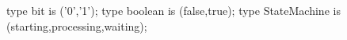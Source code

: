 type bit is ('0','1');
type boolean is (false,true);
type StateMachine is (starting,processing,waiting);